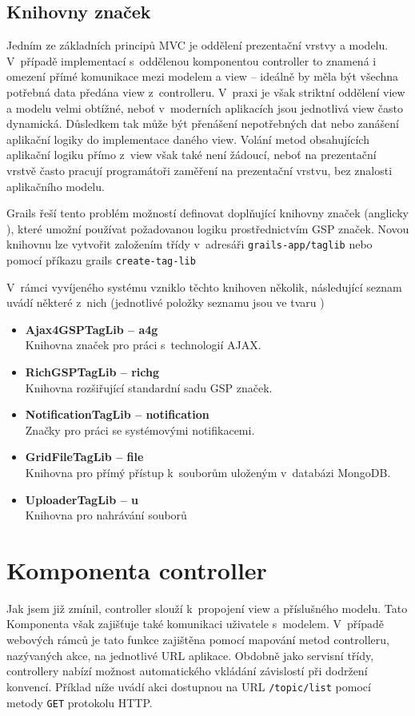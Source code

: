 \subsection{Knihovny značek}
Jedním ze základních principů MVC je oddělení prezentační vrstvy a modelu. V~případě implementací s~oddělenou komponentou controller to znamená i omezení přímé komunikace mezi modelem a view  -- ideálně by měla být všechna potřebná data předána view z~controlleru. V~praxi je však striktní oddělení view a modelu velmi obtížné, neboť v~moderních aplikacích jsou jednotlivá view často dynamická. Důsledkem tak může být přenášení nepotřebných dat nebo zanášení aplikační logiky do implementace daného view. Volání metod obsahujících aplikační logiku přímo z~view však také není žádoucí, neboť na prezentační vrstvě často pracují programátoři zaměření na prezentační vrstvu, bez znalosti aplikačního modelu.


Grails řeší tento problém možností definovat doplňující knihovny značek (anglicky ), které umožní používat požadovanou logiku prostřednictvím GSP značek. Novou knihovnu lze vytvořit založením třídy v~adresáři \texttt{grails-app/taglib} nebo pomocí příkazu grails \texttt{create-tag-lib}

V~rámci vyvíjeného systému vzniklo těchto knihoven několik, následující seznam uvádí některé z~nich (jednotlivé položky seznamu jsou ve tvaru )
\begin{itemize}
\item \textbf{Ajax4GSPTagLib -- a4g} \\
Knihovna značek pro práci s~technologií AJAX.
\item \textbf{RichGSPTagLib -- richg}\\
Knihovna rozšiřující standardní sadu GSP značek.
\item \textbf{NotificationTagLib -- notification}\\
Značky pro práci se systémovými notifikacemi.
\item \textbf{GridFileTagLib -- file}\\
Knihovna pro přímý přístup k~souborům uloženým v~databázi MongoDB.
\item \textbf{UploaderTagLib -- u}\\
Knihovna pro nahrávání souborů
\end{itemize}

\section{Komponenta controller }
Jak jsem již zmínil, controller slouží k~propojení view a příslušného modelu. Tato Komponenta však zajišťuje také komunikaci uživatele s~modelem. V~případě webových rámců je tato funkce zajištěna pomocí mapování metod controlleru, nazývaných akce, na jednotlivé URL aplikace. Obdobně jako servisní třídy, controllery nabízí možnost automatického vkládání závislostí při dodržení konvencí. Příklad níže uvádí akci dostupnou na URL \texttt{/topic/list} pomocí metody \texttt{GET} protokolu HTTP.

